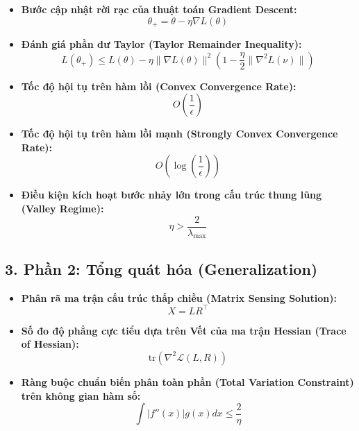 \documentclass[oneside,a4paper,13pt]{extarticle}
\begin{document}
\begin{itemize}
    \item \textbf{Bước cập nhật rời rạc của thuật toán Gradient Descent:}
    \begin{equation}
        \theta_{+} = \theta - \eta\nabla L(\theta)
    \end{equation}

    \item \textbf{Đánh giá phần dư Taylor (Taylor Remainder Inequality):}
    \begin{equation}
        L(\theta_{+}) \le L(\theta) - \eta\|\nabla L(\theta)\|^2 \left(1 - \frac{\eta}{2}\|\nabla^2 L(\nu)\|\right)
    \end{equation}

    \item \textbf{Tốc độ hội tụ trên hàm lồi (Convex Convergence Rate):}
    \begin{equation}
        O\left(\frac{1}{\epsilon}\right)
    \end{equation}

    \item \textbf{Tốc độ hội tụ trên hàm lồi mạnh (Strongly Convex Convergence Rate):}
    \begin{equation}
        O\left(\log\left(\frac{1}{\epsilon}\right)\right)
    \end{equation}

    \item \textbf{Điều kiện kích hoạt bước nhảy lớn trong cấu trúc thung lũng (Valley Regime):}
    \begin{equation}
        \eta > \frac{2}{\lambda_{\max}}
    \end{equation}
\end{itemize}

\newpage

\subsection*{3. Phần 2: Tổng quát hóa (Generalization)}

\begin{itemize}
    \item \textbf{Phân rã ma trận cấu trúc thấp chiều (Matrix Sensing Solution):}
    \begin{equation}
        X = LR^\top
    \end{equation}

    \item \textbf{Số đo độ phẳng cực tiểu dựa trên Vết của ma trận Hessian (Trace of Hessian):}
    \begin{equation}
        \text{tr}(\nabla^2 \mathcal{L}(L, R))
    \end{equation}

    \item \textbf{Ràng buộc chuẩn biến phân toàn phần (Total Variation Constraint) trên không gian hàm số:}
    \begin{equation}
        \int |f''(x)| g(x) dx \le \frac{2}{\eta}
    \end{equation}
\end{itemize}
\end{document}

